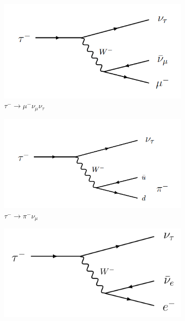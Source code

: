 \documentclass[12pt]{thesis}  %
\begin{document}
  \begin{figure}
        \centering
        \begin{subfigure}[b]{0.315\textwidth}
            \centering
            \includegraphics[width=\textwidth]{images/taumununu.png}
            \caption[Network2]%
            {{\small $\tau^-\to \mu ^-\nu_{\mu} \nu_{\tau}$}}    
            \label{fig:background feynman diagrams START}
        \end{subfigure}
        \hfill
        \begin{subfigure}[b]{0.315\textwidth}  
            \centering 
            \includegraphics[width=\textwidth]{images/taupinu.png}
            \caption[]%
            {{\small $\tau^-\to \pi^- \nu_{\mu}$}}    
        \end{subfigure}
                \hfill
        \begin{subfigure}[b]{0.315\textwidth}  
            \centering 
            \includegraphics[width=\textwidth]{images/enunu.png}

\end{subfigure}
\end{figure}
\end{document}
